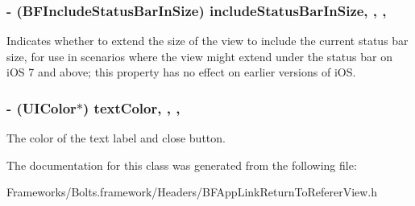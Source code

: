\subsubsection[{include\+Status\+Bar\+In\+Size}]{\setlength{\rightskip}{0pt plus 5cm}-\/ (B\+F\+Include\+Status\+Bar\+In\+Size) include\+Status\+Bar\+In\+Size\hspace{0.3cm}{\ttfamily [read]}, {\ttfamily [write]}, {\ttfamily [nonatomic]}, {\ttfamily [assign]}}\label{interface_b_f_app_link_return_to_referer_view_a640b53f5c49f1bfb5f11a81a8f7381af}
Indicates whether to extend the size of the view to include the current status bar size, for use in scenarios where the view might extend under the status bar on i\+O\+S 7 and above; this property has no effect on earlier versions of i\+O\+S. \hypertarget{interface_b_f_app_link_return_to_referer_view_acef579105c567f8f22a2604ea388a37b}{}
\subsubsection[{text\+Color}]{\setlength{\rightskip}{0pt plus 5cm}-\/ (U\+I\+Color$\ast$) text\+Color\hspace{0.3cm}{\ttfamily [read]}, {\ttfamily [write]}, {\ttfamily [nonatomic]}, {\ttfamily [strong]}}\label{interface_b_f_app_link_return_to_referer_view_acef579105c567f8f22a2604ea388a37b}
The color of the text label and close button. 

The documentation for this class was generated from the following file\+:\begin{DoxyCompactItemize}
\item 
Frameworks/\+Bolts.\+framework/\+Headers/B\+F\+App\+Link\+Return\+To\+Referer\+View.\+h\end{DoxyCompactItemize}
